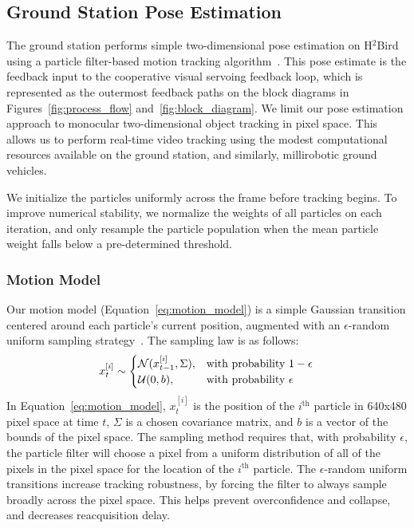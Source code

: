 \documentclass{aamas2013}
\begin{document}
\subsection{Ground Station Pose Estimation}
The ground station performs simple two-dimensional pose estimation on 
H$^2$Bird using a particle filter-based motion tracking algorithm~\cite{thrun2005probabilistic}. This pose 
estimate is the feedback input to the cooperative visual servoing feedback 
loop, which is represented as the outermost feedback paths on the block 
diagrams in Figures~\ref{fig:process_flow} and~\ref{fig:block_diagram}. We 
limit our pose estimation approach to monocular two-dimensional object 
tracking in pixel space. This allows us to perform real-time video tracking 
using the modest computational resources available on the ground station, 
and similarly, millirobotic ground vehicles.

We initialize the particles 
uniformly across the frame before tracking begins. To improve numerical 
stability, we normalize the weights of all particles on each iteration, and 
only resample the particle population when the mean particle weight falls 
below a pre-determined threshold. 
\subsubsection{Motion Model}
Our motion model (Equation~\ref{eq:motion_model}) is a simple Gaussian transition 
centered around each particle's current position, augmented with an 
$\epsilon$-random uniform sampling strategy~\cite{Doucet2001}. The sampling law is as follows:
\begin{equation}
\label{eq:motion_model}
x^{[i]}_t \sim \begin{cases}
\mathcal{N}(x^{[i]}_{t-1}, \Sigma), &\text{with probability } 1-\epsilon \\
\mathcal{U}(0,b),& \text{with probability } \epsilon \\
\end{cases}\\
\end{equation}
In Equation~\ref{eq:motion_model}, $x^{[i]}_t$ is the position of the $i^\text{th}$ 
particle in 640x480 pixel space at time $t$, $\Sigma$ is a chosen covariance matrix, and $b$ 
is a vector of the bounds of the pixel space. The sampling method requires that, with 
probability $\epsilon$, the particle filter will choose a pixel from a uniform 
distribution of all of the pixels in the pixel space for the location of the $i^\text{th}$ 
particle. The $\epsilon$-random uniform transitions increase tracking robustness, by 
forcing the filter to always sample broadly across the pixel space. This helps prevent 
overconfidence and collapse, and decreases reacquisition delay. 
\end{document}

